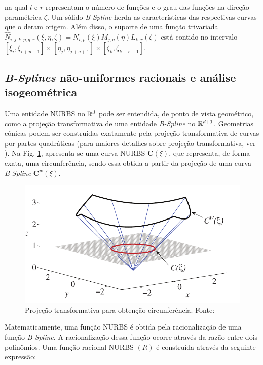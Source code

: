 \documentclass[tese_patricia]{subfiles}
\begin{document}
\noindent na qual $l$ e $r$ representam o número de funções e o grau das funções na direção paramétrica $\zeta$. Um sólido \textit{B-Spline} herda as características das respectivas curvas que o deram origem. Além disso, o suporte de uma função trivariada $\hat{N}_{i,j,k:p,q,r}\left(\xi,\eta,\zeta\right) = N_{i,p}(\xi)M_{j,q}(\eta)L_{k,r}(\zeta)$ está contido no intervalo $\left[\xi_{i},\xi_{i+p+1}\right]\times\left[\eta_{j},\eta_{j+q+1}\right]\times\left[\zeta_{k},\zeta_{k+r+1}\right]$.


\subsection{\textit{B-Splines} não-uniformes racionais e análise isogeométrica}

Uma entidade NURBS no $\mathbb{R}^{d}$ pode ser entendida, de ponto de vista geométrico, como a projeção transformativa de uma entidade \textit{B-Spline} no $\mathbb{R}^{d+1}$. Geometrias cônicas podem ser construídas exatamente pela projeção transformativa de curvas por partes quadráticas (para maiores detalhes sobre projeção transformativa, ver ). Na Fig. \ref{fig:circunferencia}, apresenta-se uma curva NURBS $\mathbf{C}\left(\xi\right)$, que representa, de forma exata, uma circunferência, sendo essa obtida a partir da projeção de uma curva \textit{B-Spline} $\mathbf{C}^{w}\left(\xi\right)$.

\begin{figure}[htb!]
	\centering 
	\includegraphics[scale=0.3,trim=0cm 0cm 0cm 0cm, clip=true]{Imagens/Cap2/transformacaoprojetiva.png}	
	\caption{Projeção transformativa para obtenção circunferência. Fonte: }
	\label{fig:circunferencia}
\end{figure}

Matematicamente, uma função NURBS é obtida pela racionalização de uma função \textit{B-Spline}. A racionalização dessa função ocorre através da razão entre dois polinômios. Uma função racional NURBS $\left(R\right)$ é construída através da seguinte expressão:
\end{document}
